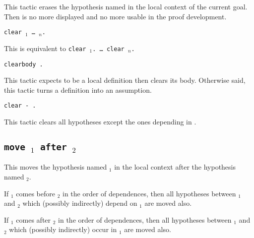This tactic erases the hypothesis named {\ident} in the local context
of the current goal. Then {\ident} is no more displayed and no more
usable in the proof development.

\begin{Variants}

\item {\tt clear {\ident$_1$} {\ldots} {\ident$_n$}.}
  
  This is equivalent to {\tt clear {\ident$_1$}. {\ldots} clear
    {\ident$_n$}.}
  
\item {\tt clearbody {\ident}.}
  
  This tactic expects {\ident} to be a local definition then clears
  its body. Otherwise said, this tactic turns a definition into an
  assumption.

\item \texttt{clear - {\ident}.} 

  This tactic clears all hypotheses except the ones depending in {\ident}.

\end{Variants}

\begin{ErrMsgs}
\item {}
\item {} 
\item {} 
\end{ErrMsgs}

\subsection{\tt move {\ident$_1$} after {\ident$_2$}
}

This moves the hypothesis named {\ident$_1$} in the local context
after the hypothesis named {\ident$_2$}.

If {\ident$_1$} comes before {\ident$_2$} in the order of dependences,
then all hypotheses between {\ident$_1$} and {\ident$_2$} which
(possibly indirectly) depend on {\ident$_1$} are moved also.

If {\ident$_1$} comes after {\ident$_2$} in the order of dependences,
then all hypotheses between {\ident$_1$} and {\ident$_2$} which 
(possibly indirectly) occur in {\ident$_1$} are moved also.


